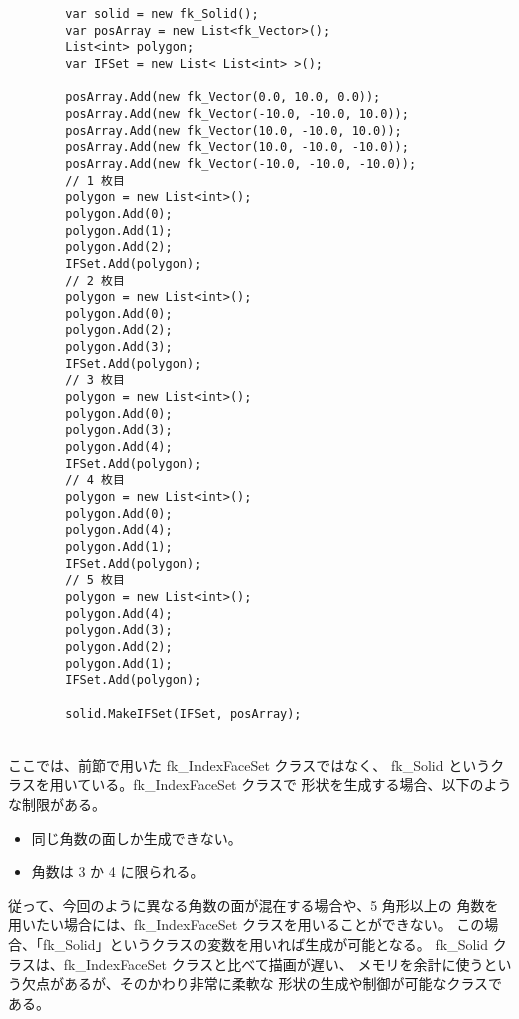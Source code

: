 \begin{breakbox}
\begin{verbatim}
        var solid = new fk_Solid();
        var posArray = new List<fk_Vector>();
        List<int> polygon;
        var IFSet = new List< List<int> >();

        posArray.Add(new fk_Vector(0.0, 10.0, 0.0));
        posArray.Add(new fk_Vector(-10.0, -10.0, 10.0));
        posArray.Add(new fk_Vector(10.0, -10.0, 10.0));
        posArray.Add(new fk_Vector(10.0, -10.0, -10.0));
        posArray.Add(new fk_Vector(-10.0, -10.0, -10.0));
        // 1 枚目
        polygon = new List<int>();
        polygon.Add(0);
        polygon.Add(1);
        polygon.Add(2);
        IFSet.Add(polygon);
        // 2 枚目
        polygon = new List<int>();
        polygon.Add(0);
        polygon.Add(2);
        polygon.Add(3);
        IFSet.Add(polygon);
        // 3 枚目
        polygon = new List<int>();
        polygon.Add(0);
        polygon.Add(3);
        polygon.Add(4);
        IFSet.Add(polygon);
        // 4 枚目
        polygon = new List<int>();
        polygon.Add(0);
        polygon.Add(4);
        polygon.Add(1);
        IFSet.Add(polygon);
        // 5 枚目
        polygon = new List<int>();
        polygon.Add(4);
        polygon.Add(3);
        polygon.Add(2);
        polygon.Add(1);
        IFSet.Add(polygon);

        solid.MakeIFSet(IFSet, posArray);
\end{verbatim}
\end{breakbox}
~ \\
ここでは、前節で用いた fk\_IndexFaceSet クラスではなく、
fk\_Solid というクラスを用いている。fk\_IndexFaceSet クラスで
形状を生成する場合、以下のような制限がある。
\begin{itemize}
 \item 同じ角数の面しか生成できない。
 \item 角数は 3 か 4 に限られる。
\end{itemize}
従って、今回のように異なる角数の面が混在する場合や、5 角形以上の
角数を用いたい場合には、fk\_IndexFaceSet クラスを用いることができない。
この場合、「fk\_Solid」というクラスの変数を用いれば生成が可能となる。
fk\_Solid クラスは、fk\_IndexFaceSet クラスと比べて描画が遅い、
メモリを余計に使うという欠点があるが、そのかわり非常に柔軟な
形状の生成や制御が可能なクラスである。

